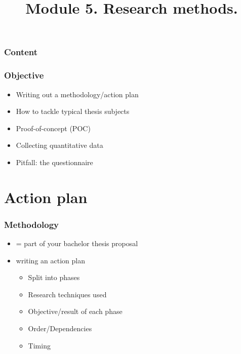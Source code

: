 \documentclass[aspectratio=169]{beamer}
\title{Module 5. Research methods.}
\subtitle{\coursename}
\author{\lecturers}   %
\date{\academicyear}
\begin{document}
\begin{frame}
  \maketitle
\end{frame}

\begin{frame}
  \frametitle{Content}

  \tableofcontents
\end{frame}

\begin{frame}
  \frametitle{Objective}

  \begin{itemize}
    \item Writing out a methodology/action plan
    \item How to tackle typical thesis subjects
    \item Proof-of-concept (POC)
    \item Collecting quantitative data
    \item Pitfall: the questionnaire
  \end{itemize}
\end{frame}

\section{Action plan}

\begin{frame}
  \frametitle{Methodology}

  \begin{itemize}
    \item = part of your bachelor thesis proposal
    \item writing an action plan
          \begin{itemize}
            \item Split into phases
            \item Research techniques used
            \item Objective/result of each phase
            \item Order/Dependencies
            \item Timing
          \end{itemize}
  \end{itemize}


\end{frame}
\end{document}
